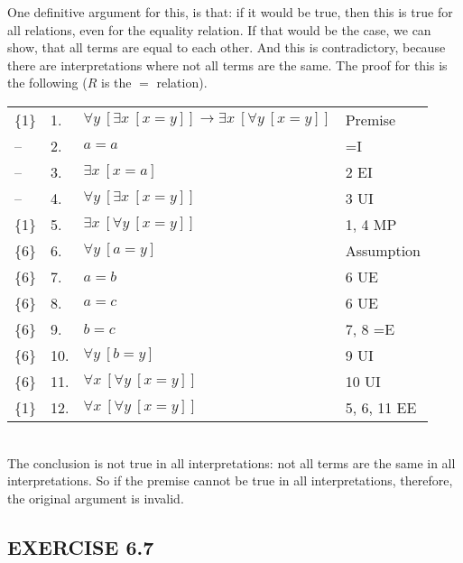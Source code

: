 \documentclass[a4paper,12pt]{article}
\newcommand{\ra}{\rightarrow}
\newcommand{\all}{\forall}
\newcommand{\ex}{\exists}
\begin{document}
\begin{enumerate}[label=\arabic*,leftmargin=*]
\begin{minipage}{\textwidth}
            One definitive argument for this, is that: if it would be true, then this is true for all relations, even for the equality relation. If that would be the case, we can show, that all terms are equal to each other. And this is contradictory, because there are interpretations where not all terms are the same. The proof for this is the following ($R$ is the $=$ relation).
            \vspace{1em}\\
            \begin{tabular}{l l l l}
                \{1\} & 1. & $\all y \ [\ex x \ [x=y]] \ra \ex x \ [\all y \ [x=y]]$ & Premise\\
                -- & 2. & $a=a$ & =I\\
                -- & 3. & $\ex x \ [x=a]$ & 2 EI\\
                -- & 4. & $\all y \ [\ex x \ [x=y]]$ & 3 UI\\
                \{1\} & 5. & $\ex x \ [\all y \ [x=y]]$ & 1, 4 MP\\
                \{6\} & 6. & $\all y \ [a=y]$ & Assumption\\
                \{6\} & 7. & $a=b$ & 6 UE\\
                \{6\} & 8. & $a=c$ & 6 UE\\
                \{6\} & 9. & $b=c$ & 7, 8 =E\\
                \{6\} & 10. & $\all y \ [b=y]$ & 9 UI\\
                \{6\} & 11. & $\all x \ [\all y \ [x=y]]$ & 10 UI\\
                \{1\} & 12. & $\all x \ [\all y \ [x=y]]$ & 5, 6, 11 EE\\
            \end{tabular}
            \vspace{1em}\\
            The conclusion is not true in all interpretations: not all terms are the same in all interpretations. So if the premise cannot be true in all interpretations, therefore, the original argument is invalid.
            \end{minipage}

    \end{enumerate}

    \subsection*{EXERCISE 6.7}
\end{document}
